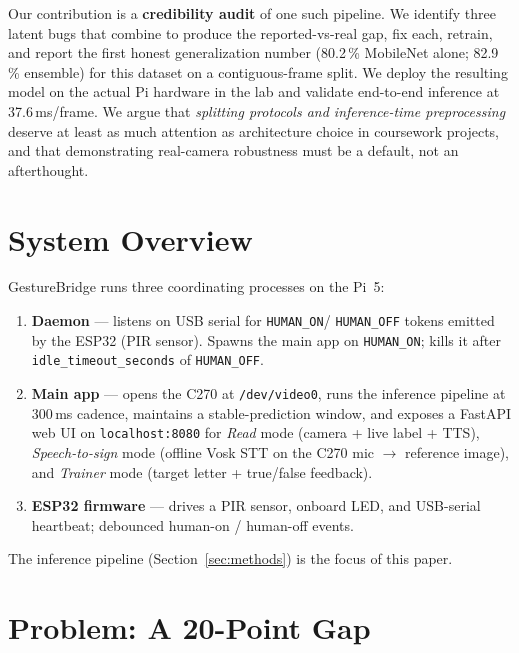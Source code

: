 \documentclass[sigconf,nonacm]{acmart}
\begin{document}
Our contribution is a \textbf{credibility audit} of one such pipeline.
We identify three latent bugs that combine to produce the
reported-vs-real gap, fix each, retrain, and report the first honest
generalization number (80.2\,\% MobileNet alone; 82.9\,\% ensemble)
for this dataset on a contiguous-frame split.  We deploy the resulting
model on the actual Pi hardware in the lab and validate end-to-end
inference at 37.6\,ms/frame.  We argue that \emph{splitting protocols
and inference-time preprocessing} deserve at least as much attention as
architecture choice in coursework projects, and that demonstrating
real-camera robustness must be a default, not an afterthought.

\section{System Overview}

GestureBridge runs three coordinating processes on the Pi~5:

\begin{enumerate}
\item \textbf{Daemon} --- listens on USB serial for \texttt{HUMAN\_ON}/
  \texttt{HUMAN\_OFF} tokens emitted by the ESP32 (PIR sensor).  Spawns
  the main app on \texttt{HUMAN\_ON}; kills it after
  \texttt{idle\_timeout\_seconds} of \texttt{HUMAN\_OFF}.

\item \textbf{Main app} --- opens the C270 at \texttt{/dev/video0}, runs
  the inference pipeline at 300\,ms cadence, maintains a
  stable-prediction window, and exposes a FastAPI web UI on
  \texttt{localhost:8080} for \emph{Read} mode (camera + live label +
  TTS), \emph{Speech-to-sign} mode (offline Vosk STT on the C270 mic $\to$ reference image),
  and \emph{Trainer} mode (target letter + true/false feedback).

\item \textbf{ESP32 firmware} --- drives a PIR sensor, onboard LED, and
  USB-serial heartbeat; debounced human-on / human-off events.
\end{enumerate}

The inference pipeline (Section~\ref{sec:methods}) is the focus of
this paper.

\section{Problem: A 20-Point Gap}
\label{sec:problem}
\end{document}

